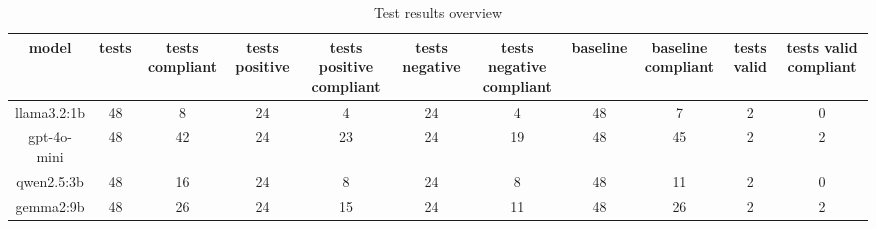 
  \begin{table}[h!]
  \centering
  \begin{tabular}{|c|c|c|c|c|c|c|c|c|c|c|}
  \hline
  model & tests & tests compliant & tests positive & tests positive compliant & tests negative & tests negative compliant & baseline & baseline compliant & tests valid & tests valid compliant \\
  \hline
  llama3.2:1b & 48 & 8 & 24 & 4 & 24 & 4 & 48 & 7 & 2 & 0\\
\hline
gpt-4o-mini & 48 & 42 & 24 & 23 & 24 & 19 & 48 & 45 & 2 & 2\\
\hline
qwen2.5:3b & 48 & 16 & 24 & 8 & 24 & 8 & 48 & 11 & 2 & 0\\
\hline
gemma2:9b & 48 & 26 & 24 & 15 & 24 & 11 & 48 & 26 & 2 & 2
  \end{tabular}
  \caption{Test results overview}
  
  \end{table}
  